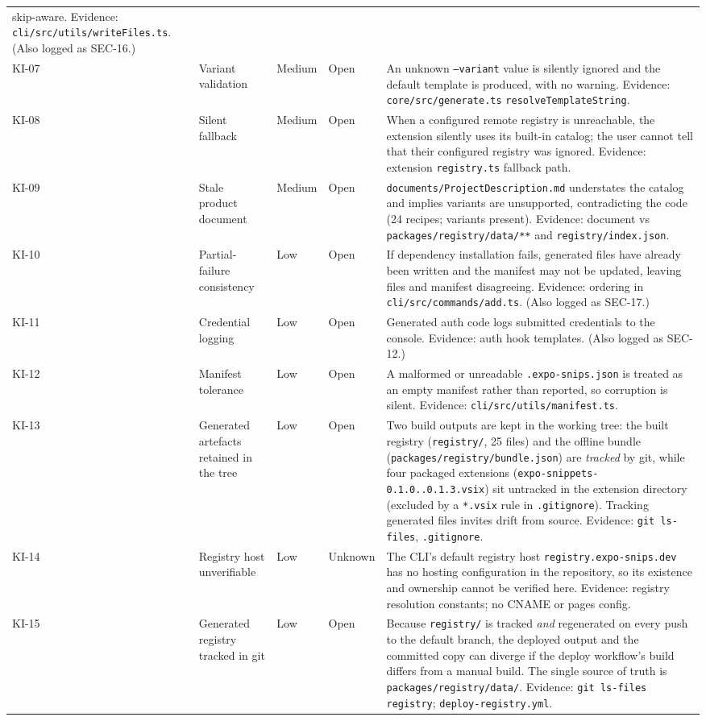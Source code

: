 \begin{longtable}{p{1.2cm}p{3.3cm}p{1.6cm}p{1.1cm}p{6.4cm}}
skip-aware. Evidence: \texttt{cli/src/utils/writeFiles.ts}. (Also logged as
SEC-16.) \\
KI-07 & Variant validation & Medium & Open & An unknown \texttt{--variant} value is
silently ignored and the default template is produced, with no warning. Evidence:
\texttt{core/src/generate.ts} \texttt{resolveTemplateString}. \\
KI-08 & Silent fallback & Medium & Open & When a configured remote registry is
unreachable, the extension silently uses its built-in catalog; the user cannot
tell that their configured registry was ignored. Evidence: extension
\texttt{registry.ts} fallback path. \\
KI-09 & Stale product document & Medium & Open & \texttt{documents/ProjectDescription.md}
understates the catalog and implies variants are unsupported, contradicting the
code (24 recipes; variants present). Evidence: document vs
\texttt{packages/registry/data/**} and \texttt{registry/index.json}. \\
KI-10 & Partial-failure consistency & Low & Open & If dependency installation
fails, generated files have already been written and the manifest may not be
updated, leaving files and manifest disagreeing. Evidence: ordering in
\texttt{cli/src/commands/add.ts}. (Also logged as SEC-17.) \\
KI-11 & Credential logging & Low & Open & Generated auth code logs submitted
credentials to the console. Evidence: auth hook templates. (Also logged as
SEC-12.) \\
KI-12 & Manifest tolerance & Low & Open & A malformed or unreadable
\texttt{.expo-snips.json} is treated as an empty manifest rather than reported, so
corruption is silent. Evidence: \texttt{cli/src/utils/manifest.ts}. \\
KI-13 & Generated artefacts retained in the tree & Low & Open & Two build
outputs are kept in the working tree: the built registry
(\texttt{registry/}, 25 files) and the offline bundle
(\texttt{packages/registry/bundle.json}) are \emph{tracked} by git, while four
packaged extensions (\texttt{expo-snippets-0.1.0..0.1.3.vsix}) sit untracked in
the extension directory (excluded by a \texttt{*.vsix} rule in
\texttt{.gitignore}). Tracking generated files invites drift from source.
Evidence: \texttt{git ls-files}, \texttt{.gitignore}. \\
KI-14 & Registry host unverifiable & Low & Unknown & The CLI's default registry
host \texttt{registry.expo-snips.dev} has no hosting configuration in the
repository, so its existence and ownership cannot be verified here. Evidence:
registry resolution constants; no CNAME or pages config. \\
KI-15 & Generated registry tracked in git & Low & Open & Because
\texttt{registry/} is tracked \emph{and} regenerated on every push to the default
branch, the deployed output and the committed copy can diverge if the deploy
workflow's build differs from a manual build. The single source of truth is
\texttt{packages/registry/data/}. Evidence: \texttt{git ls-files registry};
\texttt{deploy-registry.yml}. \\
\bottomrule
\end{longtable}

